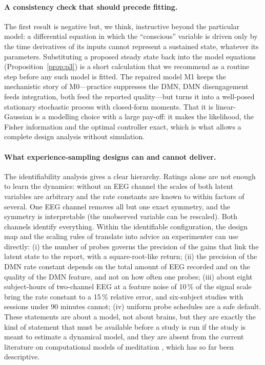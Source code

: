 \documentclass[12pt,a4paper]{article}
\theoremstyle{plain}
\theoremstyle{definition}
\theoremstyle{remark}
\begin{document}
\paragraph{A consistency check that should precede fitting.} The first result is negative but, we think, instructive beyond the particular model: a differential equation in which the ``conscious'' variable is driven only by the time derivatives of its inputs cannot represent a sustained state, whatever its parameters. Substituting a proposed steady state back into the model equations (Proposition~\ref{prop:p3}) is a short calculation that we recommend as a routine step before any such model is fitted. The repaired model M1 keeps the mechanistic story of M0---practice suppresses the DMN, DMN disengagement feeds integration, both feed the reported quality---but turns it into a well-posed stationary stochastic process with closed-form moments. That it is linear-Gaussian is a modelling choice with a large pay-off: it makes the likelihood, the Fisher information and the optimal controller exact, which is what allows a complete design analysis without simulation.

\paragraph{What experience-sampling designs can and cannot deliver.} The identifiability analysis gives a clear hierarchy. Ratings alone are not enough to learn the dynamics: without an EEG channel the scales of both latent variables are arbitrary and the rate constants are known to within factors of several. One EEG channel removes all but one exact symmetry, and the symmetry is interpretable (the unobserved variable can be rescaled). Both channels identify everything. Within the identifiable configuration, the design map and the scaling rules of  translate into advice an experimenter can use directly: (i) the number of probes governs the precision of the gains that link the latent state to the report, with a square-root-like return; (ii) the precision of the DMN rate constant depends on the total amount of EEG recorded and on the quality of the DMN feature, and not on how often one probes; (iii) about eight subject-hours of two-channel EEG at a feature noise of 10\,\% of the signal scale bring the rate constant to a 15\,\% relative error, and six-subject studies with sessions under 90 minutes cannot; (iv) uniform probe schedules are a safe default. These statements are about a model, not about brains, but they are exactly the kind of statement that must be available before a study is run if the study is meant to estimate a dynamical model, and they are absent from the current literature on computational models of meditation \citep{Laukkonen2021,SandvedSmith2021}, which has so far been descriptive.
\end{document}
